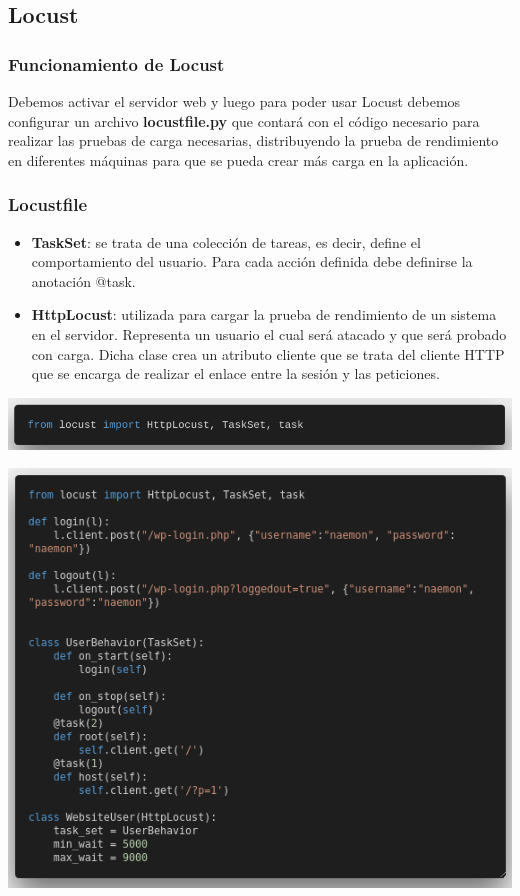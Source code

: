 \documentclass{beamer}
\theoremstyle{plain}
\theoremstyle{definition}
\theoremstyle{plain}
\theoremstyle{definition}
\theoremstyle{remark}
\theoremstyle{definition}
\begin{document}
\subsection{Locust}
\begin{frame}
	\frametitle{Funcionamiento de Locust}
	Debemos activar el servidor web y luego para poder usar Locust debemos configurar un archivo \textbf{locustfile.py} que contará con el código necesario para realizar las pruebas de carga necesarias, distribuyendo la prueba de rendimiento en diferentes máquinas para que se
	pueda crear más carga en la aplicación.
	
\end{frame}
\begin{frame}
	\frametitle{Locustfile}
	\begin{itemize}
		\item \textbf{TaskSet}: se trata de una colección de tareas, es decir, define el comportamiento del usuario. Para cada acción definida debe definirse la anotación @task.
		\item \textbf{HttpLocust}: utilizada para cargar la prueba de rendimiento de un sistema en el servidor. Representa un usuario el cual será atacado y que será probado con carga. Dicha clase crea un atributo cliente que se trata del cliente HTTP que se encarga de realizar el enlace entre la
		sesión y las peticiones.
	\end{itemize}
\begin{center}
	\includegraphics[scale=0.2]{imagenes/python.png}
\end{center}

\end{frame}
\begin{frame}
		\centering
	\includegraphics[scale=0.4]{imagenes/locustfile.png}
\end{frame}
\end{document}
